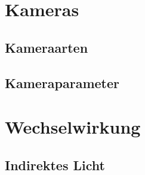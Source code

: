 
\section{Kameras}
\subsection{Kameraarten}
\subsection{Kameraparameter}

\section{Wechselwirkung}
\subsection{Indirektes Licht}
















